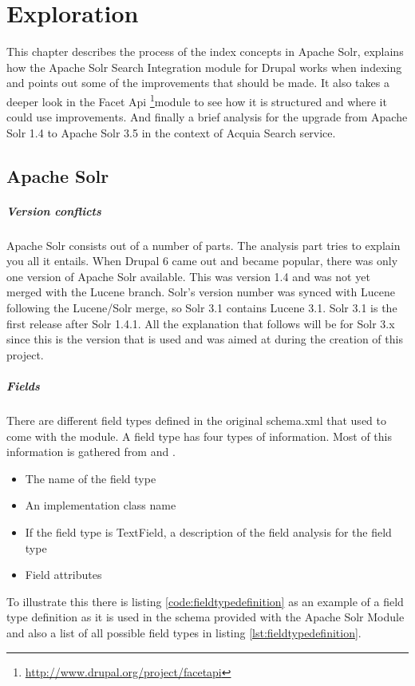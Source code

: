 \chapter{Exploration}
This chapter describes the process of the index concepts in Apache Solr, explains how the Apache Solr Search Integration module for Drupal works when indexing and points out some of the improvements that should be made. It also takes a deeper look in the Facet Api \footnote{\url{http://www.drupal.org/project/facetapi}}module to see how it is structured and where it could use improvements. And finally a brief analysis for the upgrade from Apache Solr 1.4 to Apache Solr 3.5 in the context of Acquia Search service.

\section{Apache Solr}
\paragraph{Version conflicts}
Apache Solr consists out of a number of parts. The analysis part tries to explain you all it entails. When Drupal 6 came out and became popular, there was only one version of Apache Solr available. This was version 1.4 and was not yet merged with the Lucene branch. Solr's version number was synced with Lucene following the Lucene/Solr merge, so Solr 3.1 contains Lucene 3.1. Solr 3.1 is the first release after Solr 1.4.1. All the explanation that follows will be for Solr 3.x since this is the version that is used and was aimed at during the creation of this project.

\paragraph{Fields}
There are different field types defined in the original schema.xml that used to come with the module. A field type has four types of information. Most of this information is gathered from \cite{solr3} and \cite{solr14}.
\begin{itemize}
  \item The name of the field type
  \item An implementation class name
  \item If the field type is TextField, a description of the field analysis for the field type
  \item Field attributes
\end{itemize}
To illustrate this there is listing \ref{code:fieldtypedefinition} as an example of a field type definition as it is used in the schema provided with the Apache Solr Module and also a list of all possible field types in listing \ref{lst:fieldtypedefinition}.

